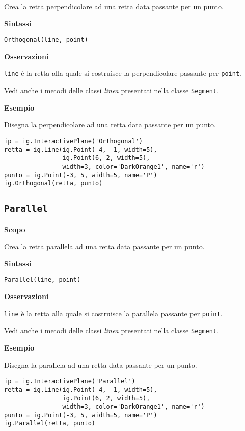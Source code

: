 Crea la retta perpendicolare ad una retta data passante per un punto.

\textbf{Sintassi}

\begin{lstlisting}
Orthogonal(line, point)
\end{lstlisting}

\textbf{Osservazioni}

\texttt{line} è la retta alla quale si costruisce la perpendicolare passante 
per \texttt{point}.

Vedi anche i metodi delle classi \emph{linea} presentati nella classe 
\texttt{Segment}.

\textbf{Esempio}

Disegna la perpendicolare ad una retta data passante per un punto.

\begin{lstlisting}
ip = ig.InteractivePlane('Orthogonal')
retta = ig.Line(ig.Point(-4, -1, width=5), 
                ig.Point(6, 2, width=5), 
                width=3, color='DarkOrange1', name='r')
punto = ig.Point(-3, 5, width=5, name='P')
ig.Orthogonal(retta, punto)
\end{lstlisting}


\subsection{\texttt{Parallel}}
\label{sub:geoint_parallel}
\textbf{Scopo}

Crea la retta parallela ad una retta data passante per un punto.

\textbf{Sintassi}

\begin{lstlisting}
Parallel(line, point)
\end{lstlisting}

\textbf{Osservazioni}

\texttt{line} è la retta alla quale si costruisce la parallela passante per
\texttt{point}.

Vedi anche i metodi delle classi \emph{linea} presentati nella classe 
\texttt{Segment}.

\textbf{Esempio}

Disegna la parallela ad una retta data passante per un punto.

\begin{lstlisting}
ip = ig.InteractivePlane('Parallel')
retta = ig.Line(ig.Point(-4, -1, width=5), 
                ig.Point(6, 2, width=5), 
                width=3, color='DarkOrange1', name='r')
punto = ig.Point(-3, 5, width=5, name='P')
ig.Parallel(retta, punto)
\end{lstlisting}


